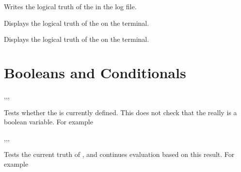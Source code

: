 \documentclass[oneside]{book}
\begin{document}
\begin{function}{\boolVarLog}
\begin{syntax}
 
\end{syntax}
Writes the logical truth of the  in the log file.
\end{function}

\begin{function}{\boolShow}
\begin{syntax}
 
\end{syntax}
Displays the logical truth of the  on the terminal.
\end{function}

\begin{function}{\boolVarShow}
\begin{syntax}
 
\end{syntax}
Displays the logical truth of the  on the terminal.
\end{function}

\section{Booleans and Conditionals}

\begin{function}{\boolIfExist,\boolIfExistT,\boolIfExistF,\boolIfExistTF}
\begin{syntax}
 
  
  
   
\end{syntax}
Tests whether the  is currently defined.  This does not
check that the  really is a boolean variable.
For example
\begin{demohigh}
\boolIfExistTF {} {}
\boolIfExistTF {} {}
\end{demohigh}
\end{function}

\begin{function}{\boolVarIf,\boolVarIfT,\boolVarIfF,\boolVarIfTF}
\begin{syntax}
 
  
  
   
\end{syntax}
Tests the current truth of , and continues evaluation
based on this result. For example
\begin{demohigh}
\boolSetTrue \lTmpaBool
\boolVarIfTF {} {}
\boolSetFalse \lTmpaBool
\boolVarIfTF {} {}
\end{demohigh}
\end{function}
\end{document}
